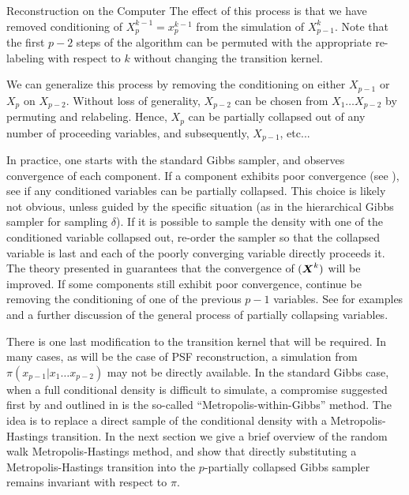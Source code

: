 \begin{chapter}{Reconstruction on the Computer}
The effect of this process is that we have removed conditioning of $X_p^{k-1} = x_p^{k-1}$ from the simulation of $X^k_{p-1}$. 
Note that the first $p-2$ steps of the algorithm can be permuted with the appropriate re-labeling with respect to $k$ without changing the transition kernel.

We can generalize this process by removing the conditioning on either $X_{p-1}$ or $X_p$ on $X_{p-2}$.
Without loss of generality, $X_{p-2}$ can be chosen from $X_1\dots X_{p-2}$ by permuting and relabeling.
Hence, $X_p$ can be partially collapsed out of any number of proceeding variables, and subsequently, $X_{p-1}$, etc...

In practice, one starts with the standard Gibbs sampler, and observes convergence of each component.
If a component exhibits poor convergence (see ), see if any conditioned variables can be partially collapsed.
This choice is likely not obvious, unless guided by the specific situation (as in the hierarchical Gibbs sampler for sampling $\delta$).
If it is possible to sample the density with one of the conditioned variable collapsed out, re-order the sampler so that the collapsed variable is last and each of the poorly converging variable directly proceeds it. 
The theory presented in \citep{van2008partially} guarantees that the convergence of $(\mbox{\boldmath$X$}^k)$ will be improved.
If some components still exhibit poor convergence, continue be removing the conditioning of one of the previous $p-1$ variables.
See \citep{van2008partially} for examples and a further discussion of the general process of partially collapsing variables.

There is one last modification to the transition kernel that will be required.
In many cases, as will be the case of PSF reconstruction, a simulation from $\pi(x_{p-1}|x_1\dots x_{p-2})$ may not be directly available.
In the standard Gibbs case, when a full conditional density is difficult to simulate, a compromise suggested first by \citep{muller1992alternatives} and outlined in \citep{robert2013monte} is the so-called ``Metropolis-within-Gibbs'' method.
The idea is to replace a direct sample of the conditional density with a Metropolis-Hastings transition. 
In the next section we give a brief overview of the random walk Metropolis-Hastings method, and show that directly substituting a Metropolis-Hastings transition into the $p$-partially collapsed Gibbs sampler remains invariant with respect to $\pi$.


\end{chapter}

